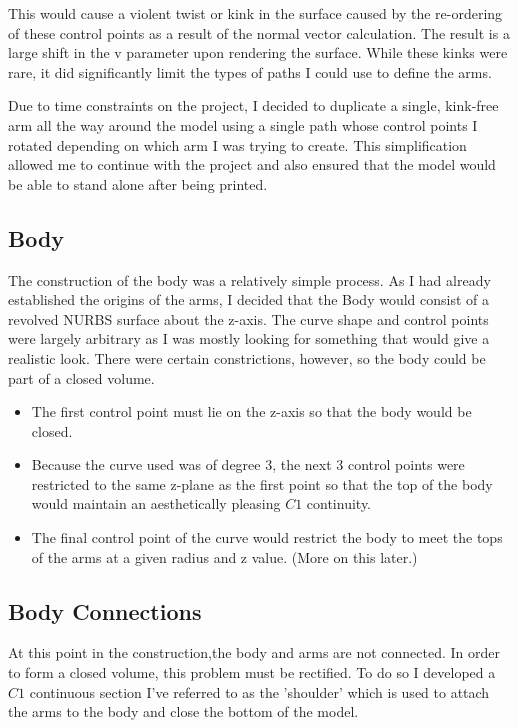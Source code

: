 \documentclass[twocolumn]{article}
\begin{document}
This would cause a violent twist or kink in the surface caused by the re-ordering of these control points as a result of the normal vector calculation. The result is a large shift in the v parameter upon rendering the surface. While these kinks were rare, it did significantly limit the types of paths I could use to define the arms.

Due to time constraints on the project, I decided to duplicate a single, kink-free arm all the way around the model using a single path whose control points I rotated depending on which arm I was trying to create. This simplification allowed me to continue with the project and also ensured that the model would be able to stand alone after being printed.
 
\subsection{Body}

The construction of the body was a relatively simple process. As I had already established the origins of the arms, I decided that the Body would consist of a revolved NURBS surface about the z-axis. The curve shape and control points were largely arbitrary as I was mostly looking for something that would give a realistic look. There were certain constrictions, however, so the body could be part of a closed volume. 

\begin{center}
\begin{itemize}
\item The first control point must lie on the z-axis so that the body would be closed.
\item Because the curve used was of degree 3, the next 3 control points were restricted to the same z-plane as the first point so that the top of the body would maintain an aesthetically pleasing $C1$ continuity.
\item The final control point of the curve would restrict the body to meet the tops of the arms at a given radius and z value. (More on this later.)
\end{itemize}
\end{center}

\subsection{Body Connections} 

At this point in the construction,the body and arms are not connected. In order to form a closed volume, this problem must be rectified. To do so I developed a $C1$ continuous section I've referred to as the 'shoulder' which is used to attach the arms to the body and close the bottom of the model. 
\end{document}
